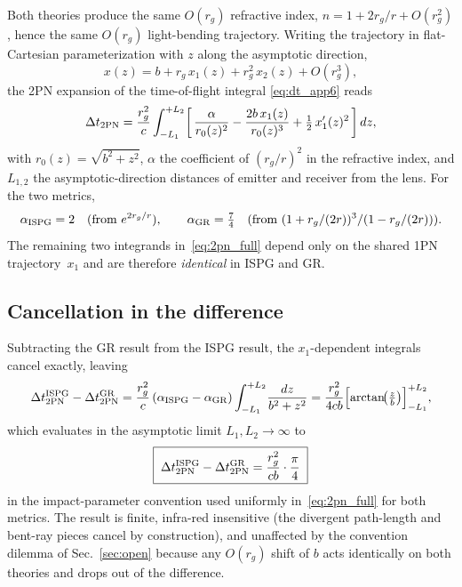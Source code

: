\documentclass[11pt]{article}
\begin{document}
Both theories produce the same $O(r_g)$ refractive index,
$n=1+2r_g/r+O(r_g^2)$, hence the same $O(r_g)$ light-bending
trajectory.  Writing the trajectory in flat-Cartesian
parameterization with $z$ along the asymptotic direction,
\begin{equation}
x(z)=b+r_g\,x_1(z)+r_g^2\,x_2(z)+O(r_g^3),
\label{eq:traj_exp}
\end{equation}
the 2PN expansion of the time-of-flight integral
\eqref{eq:dt_app6} reads
\begin{equation}
\Delta t_{2{\rm PN}}=\frac{r_g^2}{c}\int_{-L_1}^{+L_2}
\!\left[\,\frac{\alpha}{r_0(z)^2}
-\frac{2b\,x_1(z)}{r_0(z)^3}
+\tfrac12\,x_1'(z)^2\,\right]dz,
\label{eq:2pn_full}
\end{equation}
with $r_0(z)=\sqrt{b^2+z^2}$, $\alpha$ the coefficient of
$(r_g/r)^2$ in the refractive index, and $L_{1,2}$ the
asymptotic-direction distances of emitter and receiver from
the lens.  For the two metrics,
\begin{equation}
\alpha_{\rm ISPG}=2 \quad (\text{from } e^{2r_g/r}),
\qquad
\alpha_{\rm GR}=\tfrac{7}{4} \quad (\text{from }(1+r_g/(2r))^3/(1-r_g/(2r))).
\label{eq:alphas_app6}
\end{equation}
The remaining two integrands in~\eqref{eq:2pn_full} depend
only on the shared 1PN trajectory~$x_1$ and are therefore
\emph{identical} in ISPG and GR.

\subsection{Cancellation in the difference}

Subtracting the GR result from the ISPG result, the
$x_1$-dependent integrals cancel exactly, leaving
\begin{equation}
\Delta t_{2{\rm PN}}^{\rm ISPG}-\Delta t_{2{\rm PN}}^{\rm GR}
=\frac{r_g^2}{c}\,(\alpha_{\rm ISPG}-\alpha_{\rm GR})
 \int_{-L_1}^{+L_2}\!\frac{dz}{b^2+z^2}
=\frac{r_g^2}{4cb}\Bigl[\arctan\!\bigl(\tfrac{z}{b}\bigr)\Bigr]_{-L_1}^{+L_2},
\label{eq:db_finite}
\end{equation}
which evaluates in the asymptotic limit $L_1,L_2\to\infty$ to
\begin{equation}
\boxed{\;
\Delta t_{2{\rm PN}}^{\rm ISPG}-\Delta t_{2{\rm PN}}^{\rm GR}
=\frac{r_g^2}{cb}\cdot\frac{\pi}{4}\;}
\label{eq:db_inf}
\end{equation}
in the impact-parameter convention used uniformly
in~\eqref{eq:2pn_full} for both metrics.  The result is finite,
infra-red insensitive (the divergent path-length and
bent-ray pieces cancel by construction), and unaffected by
the convention dilemma of Sec.~\ref{sec:open} because any
$O(r_g)$ shift of $b$ acts identically on both theories and
drops out of the difference.
\end{document}
